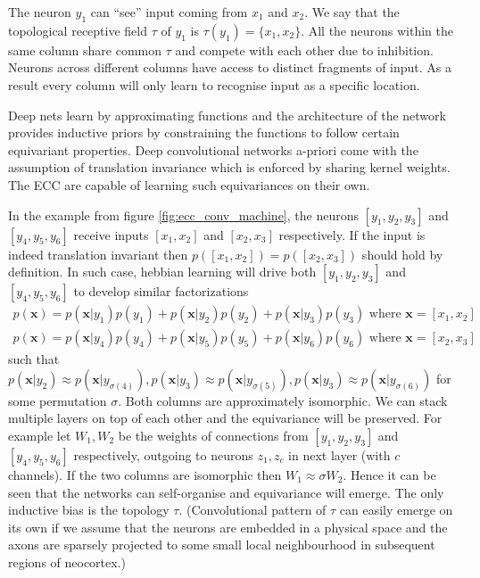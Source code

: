 \documentclass[12pt]{article}
\begin{document}
The neuron $y_1$ can ``see'' input coming from $x_1$ and $x_2$. We say that the topological receptive field $\tau$ of $y_1$ is $\tau(y_1)=\{x_1,x_2\}$. All the neurons
within the same column share common $\tau$ and compete with each other due to inhibition. Neurons across different columns have access to distinct fragments of input. As a result every column will only learn to recognise input as a specific location. 

Deep nets learn by approximating functions and the architecture of the network provides inductive priors by constraining the functions to follow certain equivariant properties. Deep convolutional networks a-priori come with the assumption of translation invariance which is enforced by sharing kernel weights. The ECC are capable of learning such equivariances on their own.

In the example from figure \ref{fig:ecc_conv_machine}, the neurons $[y_1,y_2,y_3]$ and $[y_4,y_5,y_6]$ receive inputs $[x_1,x_2]$ and $[x_2,x_3]$ respectively. If the input is indeed translation invariant then $p([x_1,x_2])=p([x_2,x_3])$ should hold by definition. In such case, hebbian learning will drive both $[y_1,y_2,y_3]$ and $[y_4,y_5,y_6]$ to develop similar factorizations
\begin{gather*}
p(\boldsymbol{x}) = p(\boldsymbol{x}|y_1)p(y_1)+  p(\boldsymbol{x}|y_2)p(y_2)+  p(\boldsymbol{x}|y_3)p(y_3)\text{ where }\boldsymbol{x}=[x_1,x_2] \\
p(\boldsymbol{x}) = p(\boldsymbol{x}|y_4)p(y_4)+  p(\boldsymbol{x}|y_5)p(y_5)+  p(\boldsymbol{x}|y_6)p(y_6)\text{ where }\boldsymbol{x}=[x_2,x_3]
\end{gather*}
such that $p(\boldsymbol{x}|y_2) \approx p(\boldsymbol{x}|y_{\sigma(4)}), p(\boldsymbol{x}|y_{3}) \approx p(\boldsymbol{x}|y_{\sigma(5)}),p(\boldsymbol{x}|y_3) \approx p(\boldsymbol{x}|y_{\sigma(6)}) $ for some permutation $\sigma$. Both columns are approximately isomorphic. We can stack multiple layers on top of each other and the equivariance will be preserved. For example let $W_1,W_2$ be the weights of connections from $[y_1,y_2,y_3]$ and   $[y_4,y_5,y_6]$ respectively, outgoing to  neurons $z_1,z_c$ in next layer (with $c$ channels). If the two columns are isomorphic then $W_1\approx\sigma W_2$. Hence it can be seen that the networks can self-organise and equivariance will emerge. The only inductive bias is the topology $\tau$. (Convolutional pattern of $\tau$ can easily emerge on its own if we assume that the neurons are embedded in a physical space and the axons are sparsely projected to some small local neighbourhood in subsequent regions of neocortex.)
\end{document}
